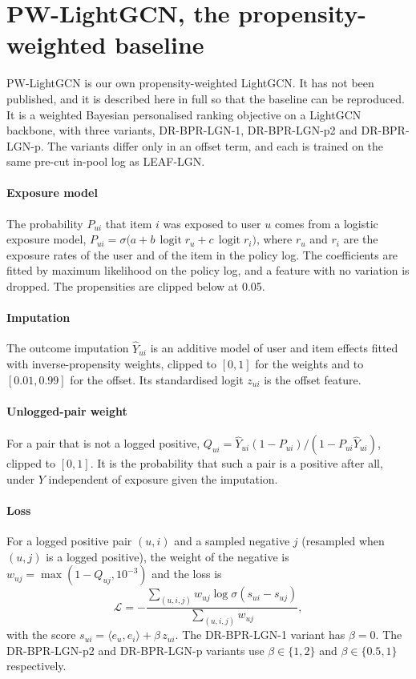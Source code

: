 \section{PW-LightGCN, the propensity-weighted baseline}\label{app:qp}

PW-LightGCN is our own propensity-weighted LightGCN. It has not been published, and it is described here in full so that the baseline can
be reproduced. It is a weighted Bayesian personalised ranking objective \citep{rendle2009bpr} on a LightGCN backbone, with three variants,
DR-BPR-LGN-1, DR-BPR-LGN-p2 and DR-BPR-LGN-p. The variants differ only in an offset term, and each is trained on the same pre-cut in-pool log
as LEAF-LGN.

\paragraph{Exposure model} The probability $P_{ui}$ that item $i$ was exposed to user $u$ comes from a logistic exposure model,
$P_{ui}=\sigma\bigl(a+b\,\operatorname{logit}r_u+c\,\operatorname{logit}r_i\bigr)$, where $r_u$ and $r_i$ are the exposure rates of the user and of
the item in the policy log. The coefficients are fitted by maximum likelihood on the policy log, and a feature with no variation is dropped. The
propensities are clipped below at 0.05.

\paragraph{Imputation} The outcome imputation $\hat Y_{ui}$ is an additive model of user and item effects fitted with inverse-propensity weights,
clipped to $[0,1]$ for the weights and to $[0.01, 0.99]$ for the offset. Its standardised logit $z_{ui}$ is the offset feature.

\paragraph{Unlogged-pair weight} For a pair that is not a logged positive, $Q_{ui}=\hat Y_{ui}(1-P_{ui})/(1-P_{ui}\hat Y_{ui})$, clipped to
$[0,1]$. It is the probability that such a pair is a positive after all, under $Y$ independent of exposure given the imputation.

\paragraph{Loss} For a logged positive pair $(u,i)$ and a sampled negative $j$ (resampled when $(u,j)$ is a logged positive), the weight of the
negative is $w_{uj}=\max(1-Q_{uj},10^{-3})$ and the loss is
\[
\mathcal L=-\frac{\sum_{(u,i,j)} w_{uj}\log\sigma(s_{ui}-s_{uj})}{\sum_{(u,i,j)} w_{uj}},
\]
with the score $s_{ui}=\langle e_u,e_i\rangle+\beta\,z_{ui}$. The DR-BPR-LGN-1 variant has $\beta=0$. The DR-BPR-LGN-p2 and DR-BPR-LGN-p variants use
$\beta\in\{1,2\}$ and $\beta\in\{0.5,1\}$ respectively.

